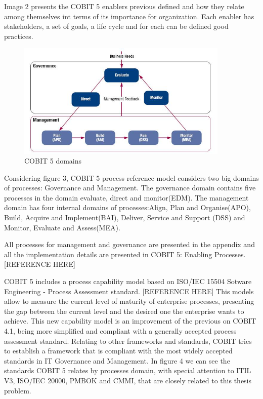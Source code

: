 Image 2 presents the COBIT 5 enablers previous defined and how they relate among themselves int terms of its importance for organization. Each enabler has stakeholders, a set of goals, a life cycle and for each can be defined good practices.\par

\begin{figure}
\centering
\includegraphics[width=0.9\textwidth]{img/COBITProcesses.jpg}
\caption{COBIT 5 domains}
\end{figure}

Considering figure 3, COBIT 5 process reference model considers two big domains of processes: Governance and Management. The governance domain contains five processes in the domain evaluate, direct and monitor(EDM). The management domain has four internal domains of processes:Align, Plan and Organise(APO), Build, Acquire and Implement(BAI), Deliver, Service and Support (DSS) and Monitor, Evaluate and Assess(MEA).\par
All processes for management and governance are presented in the appendix and all the implementation details are presented in COBIT 5: Enabling Processes.[REFERENCE HERE]\par
COBIT 5 includes a process capability model based on ISO/IEC 15504 Sotware Engineering - Process Assessment standard. [REFERENCE HERE] This models allow to measure the current level of maturity of enterprise processes, presenting the gap between the current level and the desired one the enterprise wants to achieve. This new capability model is an improvement of the previous on COBIT 4.1, being more simplified and compliant with a generally accepted process assessment standard.
Relating to other frameworks and standards, COBIT tries to establish a framework that is compliant with the most widely accepted standards in IT Governance and Management. In figure 4 we can see the standards COBIT 5 relates by processes domain, with special attention to ITIL V3, ISO/IEC 20000, PMBOK and CMMI, that are closely related to this thesis problem.

\cite{*}






